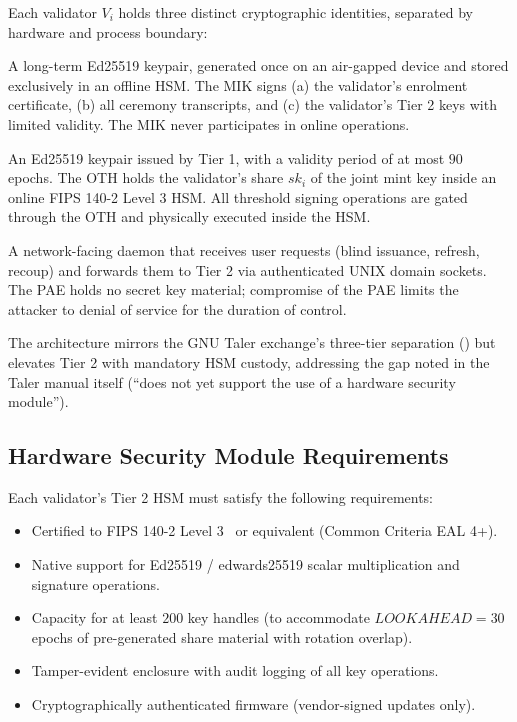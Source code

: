Each validator $V_i$ holds three distinct cryptographic identities, separated by hardware and process boundary:

\begin{description}[leftmargin=1.5em,style=nextline,itemsep=0.3em]
  \item[Tier 1 --- Offline Master Identity Key (MIK)] A long-term Ed25519 keypair, generated once on an air-gapped device and stored exclusively in an offline HSM. The MIK signs (a) the validator's enrolment certificate, (b) all ceremony transcripts, and (c) the validator's Tier 2 keys with limited validity. The MIK never participates in online operations.
  \item[Tier 2 --- Online Threshold Helper (OTH)] An Ed25519 keypair issued by Tier 1, with a validity period of at most $90$ epochs. The OTH holds the validator's share $sk_i$ of the joint mint key inside an online FIPS 140-2 Level 3 HSM. All threshold signing operations are gated through the OTH and physically executed inside the HSM.
  \item[Tier 3 --- Public API Endpoint (PAE)] A network-facing daemon that receives user requests (blind issuance, refresh, recoup) and forwards them to Tier 2 via authenticated UNIX domain sockets. The PAE holds no secret key material; compromise of the PAE limits the attacker to denial of service for the duration of control.
\end{description}

The architecture mirrors the GNU Taler exchange's three-tier separation (\cite{taler-exchange-manual}) but elevates Tier 2 with mandatory HSM custody, addressing the gap noted in the Taler manual itself (``does not yet support the use of a hardware security module'').

\subsection{Hardware Security Module Requirements}
\label{sec:mint-hsm}

Each validator's Tier 2 HSM must satisfy the following requirements:

\begin{itemize}[leftmargin=2em,itemsep=0pt]
  \item Certified to FIPS 140-2 Level 3~\cite{fips140-2} or equivalent (Common Criteria EAL 4+).
  \item Native support for Ed25519 / edwards25519 scalar multiplication and signature operations.
  \item Capacity for at least $200$ key handles (to accommodate $LOOKAHEAD = 30$ epochs of pre-generated share material with rotation overlap).
  \item Tamper-evident enclosure with audit logging of all key operations.
  \item Cryptographically authenticated firmware (vendor-signed updates only).
\end{itemize}

